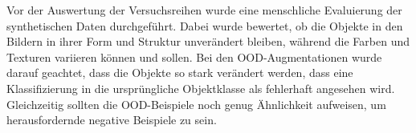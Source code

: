 Vor der Auswertung der Versuchsreihen wurde eine menschliche Evaluierung der synthetischen Daten durchgeführt. Dabei wurde bewertet, ob die Objekte in den Bildern in ihrer Form und Struktur unverändert bleiben, während die Farben und Texturen variieren können und sollen. Bei den OOD-Augmentationen wurde darauf geachtet, dass die Objekte so stark verändert werden, dass eine Klassifizierung in die ursprüngliche Objektklasse als fehlerhaft angesehen wird. Gleichzeitig sollten die OOD-Beispiele noch genug Ähnlichkeit aufweisen, um herausfordernde negative Beispiele zu sein.

